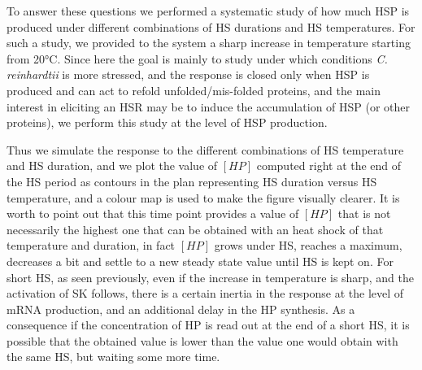 \documentclass[oneside, 10pt, a4paper, twocolumn]{article}
\begin{document}

To answer these questions we performed a systematic study of how much HSP is produced under different combinations of HS durations and HS temperatures. 
For such a study, we provided to the system a sharp increase in temperature starting from 20°C. 
Since here the goal is mainly to study under which conditions \emph{C. reinhardtii} is more stressed, and the response is closed only when HSP is produced and can act to refold unfolded/mis-folded proteins, 
and the main interest in eliciting an HSR may be to induce the accumulation of HSP (or other proteins), 
we perform this study at the level of HSP production. %

Thus we simulate the response to the different combinations of HS temperature and HS duration, and we plot the value of $\left[HP\right]$ computed right at the end of the HS period as contours in the plan representing HS duration versus HS temperature, and a colour map is used to make the figure visually clearer. 
It is worth to point out that this time point provides a value of $\left[HP\right]$ that is not necessarily the highest one that can be obtained with an heat shock of that temperature and duration, in fact $\left[HP\right]$ grows under HS, reaches a maximum, decreases a bit and settle to a new steady state value until HS is kept on. %
For short HS, as seen previously, even if the increase in temperature is sharp, and the activation of SK follows, there is a certain inertia in the response at the level of mRNA production, and an additional delay in the HP synthesis. As a consequence if the concentration of HP is read out at the end of a short HS, it is possible that the obtained value is lower than the value one would obtain with the same HS, but waiting some more time. %
\end{document}
